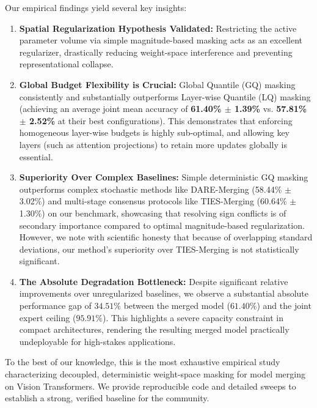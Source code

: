 Our empirical findings yield several key insights:
\begin{enumerate}
    \item \textbf{Spatial Regularization Hypothesis Validated:} Restricting the active parameter volume via simple magnitude-based masking acts as an excellent regularizer, drastically reducing weight-space interference and preventing representational collapse.
    \item \textbf{Global Budget Flexibility is Crucial:} Global Quantile (GQ) masking consistently and substantially outperforms Layer-wise Quantile (LQ) masking (achieving an average joint mean accuracy of \textbf{61.40\% $\pm$ 1.39\%} vs. \textbf{57.81\% $\pm$ 2.52\%} at their best configurations). This demonstrates that enforcing homogeneous layer-wise budgets is highly sub-optimal, and allowing key layers (such as attention projections) to retain more updates globally is essential.
    \item \textbf{Superiority Over Complex Baselines:} Simple deterministic GQ masking outperforms complex stochastic methods like DARE-Merging (58.44\% $\pm$ 3.02\%) and multi-stage consensus protocols like TIES-Merging (60.64\% $\pm$ 1.30\%) on our benchmark, showcasing that resolving sign conflicts is of secondary importance compared to optimal magnitude-based regularization. However, we note with scientific honesty that because of overlapping standard deviations, our method's superiority over TIES-Merging is not statistically significant.
    \item \textbf{The Absolute Degradation Bottleneck:} Despite significant relative improvements over unregularized baselines, we observe a substantial absolute performance gap of $34.51\%$ between the merged model ($61.40\%$) and the joint expert ceiling ($95.91\%$). This highlights a severe capacity constraint in compact architectures, rendering the resulting merged model practically undeployable for high-stakes applications.
\end{enumerate}

To the best of our knowledge, this is the most exhaustive empirical study characterizing decoupled, deterministic weight-space masking for model merging on Vision Transformers. We provide reproducible code and detailed sweeps to establish a strong, verified baseline for the community.
